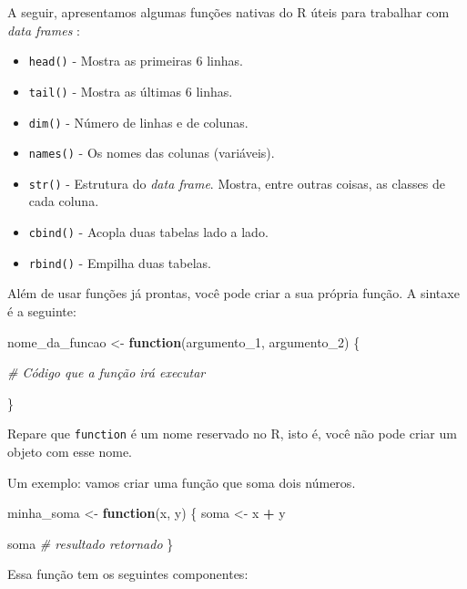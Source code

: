 \documentclass[]{book}
\newenvironment{Shaded}{\begin{snugshade}}{\end{snugshade}}
\newcommand{\CommentTok}[1]{\textcolor[rgb]{0.56,0.35,0.01}{\textit{#1}}}
\newcommand{\ControlFlowTok}[1]{\textcolor[rgb]{0.13,0.29,0.53}{\textbf{#1}}}
\newcommand{\DecValTok}[1]{\textcolor[rgb]{0.00,0.00,0.81}{#1}}
\newcommand{\NormalTok}[1]{#1}
\newcommand{\OperatorTok}[1]{\textcolor[rgb]{0.81,0.36,0.00}{\textbf{#1}}}
\newcommand{\StringTok}[1]{\textcolor[rgb]{0.31,0.60,0.02}{#1}}
\providecommand{\tightlist}{%
  \setlength{\itemsep}{0pt}\setlength{\parskip}{0pt}}
\begin{document}
A seguir, apresentamos algumas funções nativas do R úteis para trabalhar com \emph{data frames} :

\begin{itemize}
\tightlist
\item
  \texttt{head()} - Mostra as primeiras 6 linhas.
\item
  \texttt{tail()} - Mostra as últimas 6 linhas.
\item
  \texttt{dim()} - Número de linhas e de colunas.
\item
  \texttt{names()} - Os nomes das colunas (variáveis).
\item
  \texttt{str()} - Estrutura do \emph{data frame}. Mostra, entre outras coisas, as classes de cada coluna.
\item
  \texttt{cbind()} - Acopla duas tabelas lado a lado.
\item
  \texttt{rbind()} - Empilha duas tabelas.
\end{itemize}

Além de usar funções já prontas, você pode criar a sua própria função. A sintaxe é a seguinte:

\begin{Shaded}
\begin{Highlighting}[]
\NormalTok{nome_da_funcao <-}\StringTok{ }\ControlFlowTok{function}\NormalTok{(argumento_}\DecValTok{1}\NormalTok{, argumento_}\DecValTok{2}\NormalTok{) \{}
  
  \CommentTok{# Código que a função irá executar}
  
\NormalTok{\}}
\end{Highlighting}
\end{Shaded}

Repare que \texttt{function} é um nome reservado no R, isto é, você não pode criar um objeto com esse nome.

Um exemplo: vamos criar uma função que soma dois números.

\begin{Shaded}
\begin{Highlighting}[]
\NormalTok{minha_soma <-}\StringTok{ }\ControlFlowTok{function}\NormalTok{(x, y) \{}
\NormalTok{  soma <-}\StringTok{ }\NormalTok{x }\OperatorTok{+}\StringTok{ }\NormalTok{y}
  
\NormalTok{  soma  }\CommentTok{# resultado retornado}
\NormalTok{\}}
\end{Highlighting}
\end{Shaded}

Essa função tem os seguintes componentes:
\end{document}
